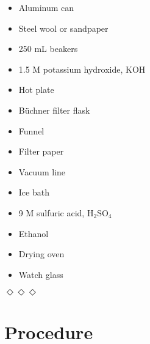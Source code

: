 \documentclass{report}
\begin{document}
\begin{itemize}
    \item Aluminum can
    \item Steel wool or sandpaper
    \item 250 mL beakers
    \item 1.5 M potassium hydroxide, KOH
    \item Hot plate
    \item Büchner filter flask
    \item Funnel
    \item Filter paper
    \item Vacuum line
    \item Ice bath
    \item 9 M sulfuric acid, H$_2$SO$_4$
    \item Ethanol
    \item Drying oven
    \item Watch glass
\end{itemize}

\bigskip
\centerline{$\Diamond\Diamond\Diamond$} %
\bigskip

\section*{Procedure}
\end{document}
